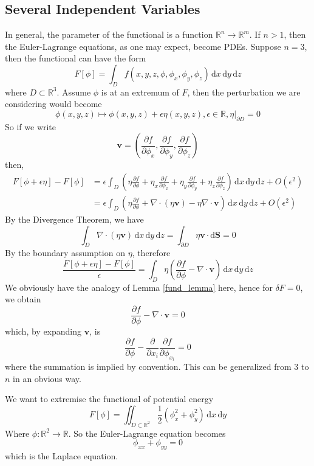 \documentclass{article}
\begin{document}
\subsection{Several Independent Variables}
In general, the parameter of the functional is a function $\mathbb R^n\to\mathbb R^m$.
If $n>1$, then the Euler-Lagrange equations, as one may expect, become PDEs.
Suppose $n=3$, then the functional can have the form
$$F[\phi]=\int_Df(x,y,z,\phi,\phi_x,\phi_y,\phi_z)\,\mathrm dx\,\mathrm dy\,\mathrm dz$$
where $D\subset\mathbb R^3$.
Assume $\phi$ is at an extremum of $F$, then the perturbation we are considering would become
$$\phi(x,y,z)\mapsto \phi(x,y,z)+\epsilon \eta(x,y,z), \epsilon\in\mathbb R,\eta|_{\partial D}=0$$
So if we write
$$\mathbf{v}=\left( \frac{\partial f}{\partial \phi_x},\frac{\partial f}{\partial \phi_y},\frac{\partial f}{\partial\phi_z} \right)$$
then,
\begin{align*}
    F[\phi+\epsilon\eta]-F[\phi]&=\epsilon\int_D\left( \eta\frac{\partial f}{\partial\phi}+\eta_x\frac{\partial f}{\partial \phi_x}+\eta_y\frac{\partial f}{\partial \phi_y}+\eta_z\frac{\partial f}{\partial \phi_z} \right)\,\mathrm dx\,\mathrm dy\,\mathrm dz+O(\epsilon^2)\\
    &=\epsilon\int_D\left( \eta\frac{\partial f}{\partial\phi}+\nabla\cdot( \eta\mathbf{v})-\eta\nabla\cdot\mathbf{v} \right)\,\mathrm dx\,\mathrm dy\,\mathrm dz+O(\epsilon^2)
\end{align*}
By the Divergence Theorem, we have
$$\int_D\nabla\cdot(\eta\mathbf{v})\,\mathrm dx\,\mathrm dy\,\mathrm dz=\int_{\partial D}\eta\mathbf{v}\cdot\mathrm d\mathbf{S}=0$$
By the boundary assumption on $\eta$, therefore
$$\frac{F[\phi+\epsilon\eta]-F[\phi]}{\epsilon}=\int_D\eta\left( \frac{\partial f}{\partial\phi}-\nabla\cdot\mathbf{v} \right)\,\mathrm dx\,\mathrm dy\,\mathrm dz$$
We obviously have the analogy of Lemma \ref{fund_lemma} here, hence for $\delta F=0$, we obtain
$$\frac{\partial f}{\partial\phi}-\nabla\cdot\mathbf{v}=0$$
which, by expanding $\mathbf{v}$, is
$$\frac{\partial f}{\partial\phi}-\frac{\partial}{\partial x_i}\frac{\partial f}{\partial \phi_{x_i}}=0$$
where the summation is implied by convention.
This can be generalized from $3$ to $n$ in an obvious way.

\begin{example}
    We want to extremise the functional of potential energy
    $$F[\phi]=\iint_{D\subset\mathbb R^2}\frac{1}{2}(\phi_x^2+\phi_y^2)\,\mathrm dx\,\mathrm dy$$
    Where $\phi:\mathbb R^2\to\mathbb R$.
    So the Euler-Lagrange equation becomes
    $$\phi_{xx}+\phi_{yy}=0$$
    which is the Laplace equation.
\end{example}
\end{document}
